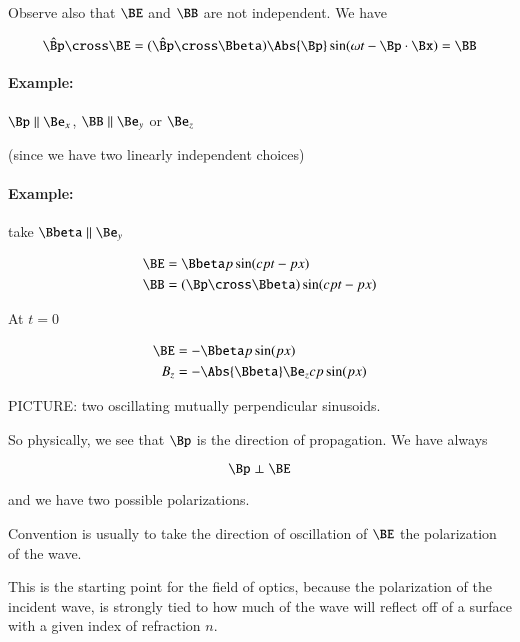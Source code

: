 Observe also that $\BE$ and $\BB$ are not independent.  We have

\begin{equation}\label{eqn:relativisticElectrodynamicsL16:271}
\hat{\Bp} \cross \BE = (\hat{\Bp} \cross \Bbeta) \Abs{\Bp} \sin(\omega t - \Bp \cdot \Bx) = \BB
\end{equation}

\paragraph{Example:} $\Bp \parallel \Be_x$, $\BB \parallel \Be_y$ or $\Be_z$

(since we have two linearly independent choices)

\paragraph{Example:} take $\Bbeta \parallel \Be_y$

\begin{align}\label{eqn:relativisticElectrodynamicsL16:290}
\BE &= \Bbeta p \sin(c p t - p x)  \\
\BB &= (\Bp \cross \Bbeta) \sin(c p t - p x)
\end{align}

At $t = 0$

\begin{align}\label{eqn:relativisticElectrodynamicsL16:310}
\BE &= -\Bbeta p \sin( p x)  \\
B_z &= - \Abs{\Bbeta} \Be_z c p \sin(p x)
\end{align}

PICTURE: two oscillating mutually perpendicular sinusoids.

So physically, we see that $\Bp$ is the direction of propagation.  We have always

\begin{equation}\label{eqn:relativisticElectrodynamicsL16:330}
\Bp \perp \BE
\end{equation}

and we have two possible polarizations.

Convention is usually to take the direction of oscillation of $\BE$ the polarization of the wave.

This is the starting point for the field of optics, because the polarization of the incident wave, is strongly tied to how much of the wave will reflect off of a surface with a given index of refraction $n$.

